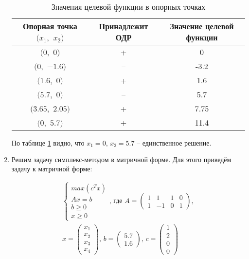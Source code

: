 \begin{enumerate}
\begin{table}[H]
\begin{center}
	\caption{Значения целевой функции в опорных точках}
	\label{tab:target-function}
	\def\tabcolsep{10pt}
	\def\arraystretch{1.23}
	\fontsize{13}{14}\selectfont
	\begin{tabular}{|c|c|c|}
		\hline 
		Опорная точка $(x_1,$ $x_2)$ & Принадлежит ОДР & Значение целевой функции \\ 
		\hline 
		$(0,$ $0)$ & + & 0 \\ 
		\hline 
		$(0,$ $-1.6)$ & -- & -3.2 \\ 
		\hline 
		$(1.6,$ $0)$ & + & 1.6 \\ 
		\hline 
		$(5.7,$ $0)$ & -- & 5.7 \\ 
		\hline 
		$(3.65,$ $2.05)$ & + & 7.75 \\ 
		\hline 
		$(0,$ $5.7)$ & + & 11.4 \\ 
	\hline 
	\end{tabular} 
\end{center}
\end{table}

По таблице \ref{tab:target-function} видно, что $x_1 = 0$, $x_2 = 5.7$ -- единственное решение.

\item Решим задачу симплекс-методом в матричной форме. Для этого приведём задачу к матричной форме:

\begin{equation}
\begin{aligned}
\begin{cases}
	max \left( c^T x \right)
	\\
	Ax = b
	\\
	b \geq 0
	\\
	x \geq 0
	\end{cases}
	\text{, где }
	A = \begin{pmatrix}
		1 & 1 & 1 & 0
		\\
		1 & -1 & 0 & 1
	\end{pmatrix},\\
	x = \begin{pmatrix}
		x_1 \\ x_2 \\ x_3 \\ x_4
	\end{pmatrix} \text{, }
	b = \begin{pmatrix}
		5.7 \\ 1.6
	\end{pmatrix} \text{, }
	c = \begin{pmatrix}
		1 \\ 2 \\ 0 \\ 0
	\end{pmatrix}
\end{aligned}
\end{equation}


\end{enumerate}
